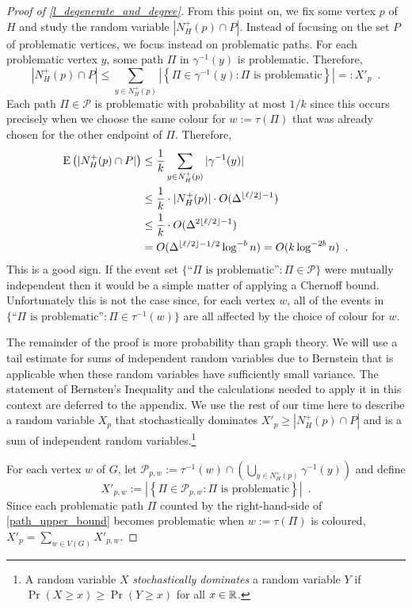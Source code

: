 \documentclass{patmorin}
\newcommand{\defin}[1]{\emph{\color{brightmaroon}#1}}
\begin{document}
\begin{proof}[Proof of \cref{l_degenerate_and_degree}]
  From this point on, we fix some vertex $p$ of $H$ and study the random variable $|N_H^+(p)\cap P|$.  Instead of focusing on the set $P$ of problematic vertices, we focus instead on problematic paths.  For each problematic vertex $y$, some path $\Pi$ in $\gamma^{-1}(y)$ is problematic. Therefore,
  \begin{equation}
    |N^+_H(p)\cap P| \le \sum_{y\in N^+_H(p)} \left|\left\{\Pi\in\gamma^{-1}(y): \text{$\Pi$ is problematic}\right\}\right| =: X'_{p} \enspace .
    \label{path_upper_bound}
  \end{equation}
  Each path $\Pi\in\mathcal{P}$ is problematic with probability at most $1/k$ since this occurs precisely when we choose the same colour for $w:=\tau(\Pi)$ that was already chosen for the other endpoint of $\Pi$.  Therefore,
  \begin{align*}
    \mathrm{E}\left(|N^+_H(p)\cap P|\right)
    & \le \frac{1}{k}\sum_{y\in N^+_H(p)}|\gamma^{-1}(y)| \\
    & \le \frac{1}{k}\cdot|N^+_H(p)|\cdot O(\Delta^{\lfloor\ell /2\rfloor-1}) \\
    & \le \frac{1}{k}\cdot O(\Delta^{2\lfloor\ell /2\rfloor-1}) \\
    & = O(\Delta^{\lfloor\ell /2\rfloor-1/2}\log^{-b} n) = O(k\log^{-2b} n) \enspace .
  \end{align*}
  This is a good sign. If the event set $\{\text{``$\Pi$ is problematic''}:\Pi\in\mathcal{P}\}$ were mutually independent then it would be a simple matter of applying a Chernoff bound.  Unfortunately this is not the case since, for each vertex $w$, all of the events in $\{\text{``$\Pi$ is problematic''}:\Pi\in\tau^{-1}(w)\}$ are all affected by the choice of colour for $w$.

  The remainder of the proof is more probability than graph theory.  We will use a tail estimate for sums of independent random variables due to Bernstein that is applicable when these random variables have sufficiently small variance.  The statement of Bernsten's Inequality and the calculations needed to apply it in this context are deferred to the appendix. We use the rest of our time here to describe a random variable $X_p$ that stochastically dominates $X'_p\ge |N^+_H(p)\cap P|$ and is a sum of independent random variables.\footnote{A random variable $X$ \defin{stochastically dominates} a random variable $Y$ if $\Pr(X\ge x) \ge \Pr(Y\ge x)$ for all $x\in\mathbb{R}$.}

  For each vertex $w$ of $G$, let $\mathcal{P}_{p,w}:=\tau^{-1}(w)\cap (\bigcup_{y\in N^+_H(p)}\gamma^{-1}(y))$ and define
  \[
    X'_{p,w} :=\left|\left\{\Pi\in\mathcal{P}_{p,w}:\text{$\Pi$ is problematic}\right\}\right|
    \enspace .
  \]
  Since each problematic path $\Pi$ counted by the right-hand-side of \cref{path_upper_bound} becomes problematic when $w:=\tau(\Pi)$ is coloured, $X'_p=\sum_{w\in V(G)} X'_{p,w}$.


\end{proof}
\end{document}
